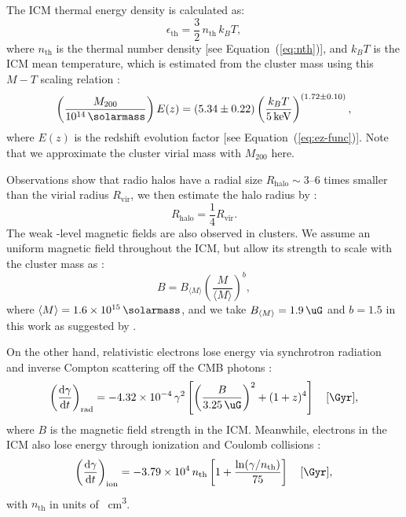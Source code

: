 \documentclass[modern]{aastex61}
\newcommand{\R}[1]{\mathrm{#1}}
\newcommand{\D}[1]{\R{d} #1}
\newcommand{\diff}[2]{\frac{\D{#1}}{\D{#2}}}
\begin{document}
The ICM thermal energy density is calculated as:
\begin{equation}
  \label{eq:eth}
  \epsilon_{\R{th}} = \frac{3}{2} \,n_{\R{th}} \,k_B T,
\end{equation}
where $n_{\R{th}}$ is the thermal number density [see Equation~(\ref{eq:nth})],
and $k_B T$ is the ICM mean temperature, which is estimated
from the cluster mass using this $M \!-\! T$ scaling relation
\citep{arnaud2005}:
\begin{equation}
  \label{eq:mt-relation}
  \left( \frac{M_{200}}{\SI{e14}{\solarmass}} \right) E(z) = (5.34 \pm 0.22)
  \left( \frac{k_B T}{\SI{5}{\keV}} \right)^{(1.72 \pm 0.10)},
\end{equation}
where $E(z)$ is the redshift evolution factor [see Equation~(\ref{eq:ez-func})].
Note that we approximate the cluster virial mass with $M_{200}$ here.

Observations show that radio halos have a radial size
$R_{\R{halo}} \sim \numrange{3}{6}$ times smaller than the virial radius
$R_{\R{vir}}$, we then estimate the halo radius by
\citep{cassano2007,zandanel2014}:
\begin{equation}
  \label{eq:rhalo-rvir}
  R_{\R{halo}} = \frac{1}{4} R_{\R{vir}}.
\end{equation}
The weak \si{\uG}-level magnetic fields are also observed in clusters.
We assume an uniform magnetic field throughout the ICM,
but allow its strength to scale with the cluster mass as \citep{cassano2012}:
\begin{equation}
  \label{eq:magfield-mass}
  B = B_{\langle{M}\rangle} \left( \frac{M}{\langle{M}\rangle} \right)^b,
\end{equation}
where $\langle {M} \rangle = \SI{1.6e15}{\solarmass}$, and we take
$B_{\langle {M} \rangle} = \SI{1.9}{\uG}$ and $b = 1.5$ in this work
as suggested by \citet{cassano2006}.

On the other hand,
relativistic electrons lose energy via synchrotron radiation
and inverse Compton scattering off the CMB photons \citep{sarazin1999}:
\begin{equation}
  \label{eq:eloss-rad}
  \left( \diff{\gamma}{t} \right)_{\R{rad}} =
  \num{-4.32e-4} \,\gamma^2
  \left[ \left( \frac{B}{\SI{3.25}{\uG}} \right)^2 +
  (1+z)^4 \right] \quad [\si{\per\Gyr}],
\end{equation}
where $B$ is the magnetic field strength in the ICM.
Meanwhile, electrons in the ICM also lose energy through
ionization and Coulomb collisions \citep{sarazin1999}:
\begin{equation}
  \label{eq:eloss-ion}
  \left( \diff{\gamma}{t} \right)_{\R{ion}} =
  \num{-3.79e4} \,n_{\R{th}} \left[ 1 +
    \frac{\ln(\gamma/n_{\R{th}})}{75} \right] \quad [\si{\per\Gyr}],
\end{equation}
with $n_{\R{th}}$ in units of \si{\per\cm\cubed}.
\end{document}
